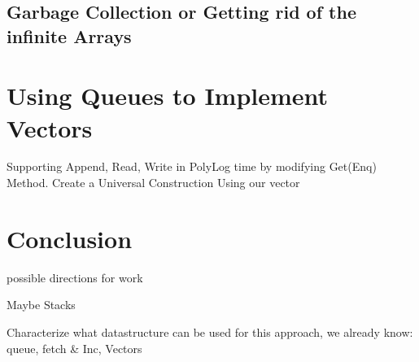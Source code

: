 \documentclass[10pt]{article}
\theoremstyle{definition}
\begin{document}
\pagebreak
\subsection{Garbage Collection or Getting rid of the infinite Arrays}

\pagebreak
\section{Using Queues to Implement Vectors}
Supporting Append, Read, Write in PolyLog time by modifying Get(Enq) Method. Create a Universal Construction Using our vector

\pagebreak
\section{Conclusion}
possible directions for work

Maybe Stacks

Characterize what datastructure can be used for this approach, we already know: queue, fetch \& Inc, Vectors
\end{document}
